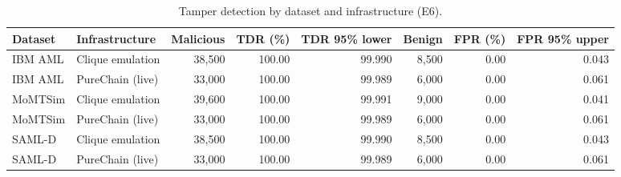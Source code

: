 \begin{table}[t]
\centering
\scriptsize
\caption{Tamper detection by dataset and infrastructure (E6).}
\label{tab:tamperds}
\begin{adjustbox}{max width=\textwidth}
\begin{tabular}{llrrrrrr}
\toprule
Dataset & Infrastructure & Malicious & TDR (\%) & TDR 95\% lower & Benign & FPR (\%) & FPR 95\% upper \\
\midrule
IBM AML & Clique emulation & 38,500 & 100.00 & 99.990 & 8,500 & 0.00 & 0.043 \\
IBM AML & PureChain (live) & 33,000 & 100.00 & 99.989 & 6,000 & 0.00 & 0.061 \\
MoMTSim & Clique emulation & 39,600 & 100.00 & 99.991 & 9,000 & 0.00 & 0.041 \\
MoMTSim & PureChain (live) & 33,000 & 100.00 & 99.989 & 6,000 & 0.00 & 0.061 \\
SAML-D & Clique emulation & 38,500 & 100.00 & 99.990 & 8,500 & 0.00 & 0.043 \\
SAML-D & PureChain (live) & 33,000 & 100.00 & 99.989 & 6,000 & 0.00 & 0.061 \\
\bottomrule
\end{tabular}\end{adjustbox}
\end{table}

